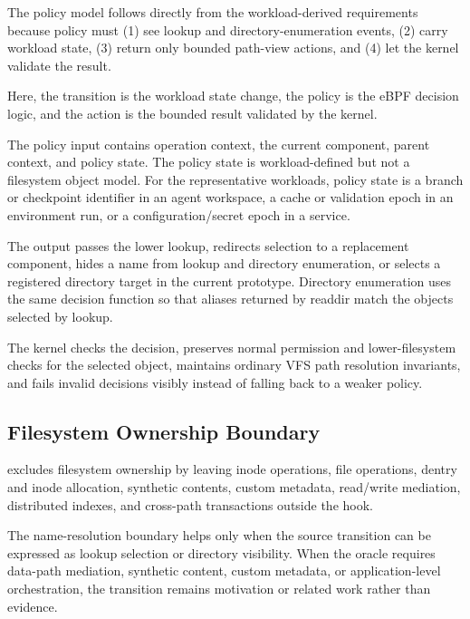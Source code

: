 The policy model follows directly from the workload-derived requirements
because policy must (1) see lookup and directory-enumeration events, (2) carry
workload state, (3) return only bounded path-view actions, and (4) let the
kernel validate the result.

Here, the transition is the workload state change, the policy is the eBPF
decision logic, and the action is the bounded result validated by the kernel.

The policy input contains operation context, the current component, parent
context, and policy state. The policy state is workload-defined but not a
filesystem object model. For the representative workloads, policy state is a
branch or checkpoint identifier in an agent workspace, a cache or validation
epoch in an environment run, or a configuration/secret epoch in a service.

The output passes the lower lookup, redirects selection to a replacement
component, hides a name from lookup and directory enumeration, or selects a
registered directory target in the current prototype. Directory enumeration
uses the same decision function so that aliases returned by readdir match the
objects selected by lookup.

The kernel checks the decision, preserves normal permission and
lower-filesystem checks for the selected object, maintains ordinary VFS path
resolution invariants, and fails invalid decisions visibly instead of falling
back to a weaker policy.

\subsection{Filesystem Ownership Boundary}

\namei excludes filesystem ownership by leaving inode operations, file
operations, dentry and inode allocation, synthetic contents, custom metadata,
read/write mediation, distributed indexes, and cross-path transactions outside
the hook.

The name-resolution boundary helps only when the source transition can
be expressed as lookup selection or directory visibility. When the oracle
requires data-path mediation, synthetic content, custom metadata, or
application-level orchestration, the transition remains motivation or related
work rather than \namei evidence.
